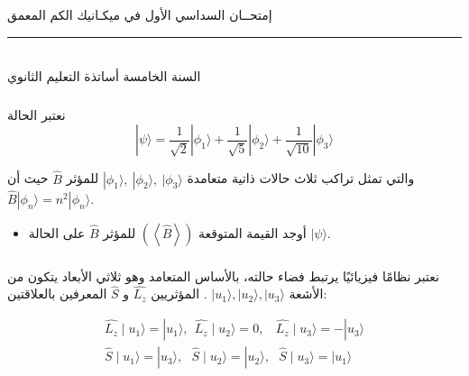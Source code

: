 \documentclass[a4paper,14pt]{article}
\begin{document}
	
\begin{center}
	{\Large\sffamily إمتحــان السداسي الأول في ميكـانيك الكم المعمق }
\end{center}
\rule{\textwidth}{1pt}\\
{\sffamily السنة الخامسة أساتذة التعليم الثانوي}\hspace*{\fill}{\sffamily $ 2024/01/15 $}




	
\subsubsection*{}		
		
نعتبر الحالة 
\begin{equation*}
	|\psi\rangle= \dfrac{1}{\sqrt{2}}|\phi_{1}\rangle + \dfrac{1}{\sqrt{5}}|\phi_{2}\rangle + \dfrac{1}{\sqrt{10}}|\phi_{3}\rangle
\end{equation*}	

والتي تمثل تراكب ثلاث حالات ذاتية متعامدة	
$|\phi_{1}\rangle,~|\phi_{2}\rangle,~	|\phi_{3}\rangle $ 
للمؤثر $\hat{B}$ حيث أن $\hat{B}|\phi_{n}\rangle = n^{2}|\phi_{n}\rangle$.

\begin{itemize}
	\item 
أوجد القيمة المتوقعة $(\left\langle\hat{B}\right\rangle)$ للمؤثر $\hat{B}$ على الحالة $|\psi\rangle$.
\end{itemize}



\subsubsection*{}
	
نعتبر نظامًا فيزيائيًا يرتبط فضاء حالته، بالأساس المتعامد وهو ثلاثي الأبعاد يتكون من الأشعة $|u_{1}\rangle, 	|u_{2}\rangle, 	|u_{3}\rangle $ . المؤثريين $\hat{L_{z}}$ و $\hat{S}$ المعرفين بالعلاقتين:

\begin{equation*}
	\label{eqn:1}
	\begin{array}{ccl}
		\hat{L_{z}}\mid u_{1}\rangle = |u_{1}\rangle,~~ \hat{L_{z}}\mid u_{2}\rangle= 0,~~~~ \hat{L_{z}}\mid u_{3}\rangle=-|u_{3}\rangle\\
		
		\hat{S} \mid u_{1}\rangle = |u_{3}\rangle,~~~ \hat{S}\mid u_{2}\rangle=|u_{2}\rangle , ~~~\hat{S}\mid u_{3}\rangle=|u_{1}\rangle
	\end{array}
\end{equation*} 
 
\end{document}
